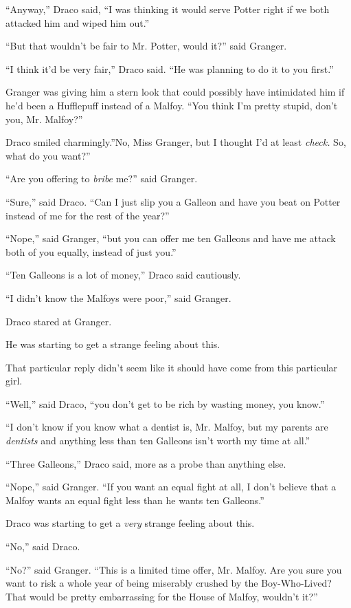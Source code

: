 ``Anyway,'' Draco said, ``I was thinking it would serve Potter right if
we both attacked him and wiped him out.''

``But that wouldn't be fair to Mr. Potter, would it?'' said Granger.

``I think it'd be very fair,'' Draco said. ``He was planning to do it to
you first.''

Granger was giving him a stern look that could possibly have intimidated
him if he'd been a Hufflepuff instead of a Malfoy. ``You think I'm
pretty stupid, don't you, Mr. Malfoy?''

Draco smiled charmingly.''No, Miss Granger, but I thought I'd at least
\emph{check.} So, what do you want?''

``Are you offering to \emph{bribe} me?'' said Granger.

``Sure,'' said Draco. ``Can I just slip you a Galleon and have you beat
on Potter instead of me for the rest of the year?''

``Nope,'' said Granger, ``but you can offer me ten Galleons and have me
attack both of you equally, instead of just you.''

``Ten Galleons is a lot of money,'' Draco said cautiously.

``I didn't know the Malfoys were poor,'' said Granger.

Draco stared at Granger.

He was starting to get a strange feeling about this.

That particular reply didn't seem like it should have come from this
particular girl.

``Well,'' said Draco, ``you don't get to be rich by wasting money, you
know.''

``I don't know if you know what a dentist is, Mr. Malfoy, but my parents
are \emph{dentists} and anything less than ten Galleons isn't worth my
time at all.''

``Three Galleons,'' Draco said, more as a probe than anything else.

``Nope,'' said Granger. ``If you want an equal fight at all, I don't
believe that a Malfoy wants an equal fight less than he wants ten
Galleons.''

Draco was starting to get a \emph{very} strange feeling about this.

``No,'' said Draco.

``No?'' said Granger. ``This is a limited time offer, Mr. Malfoy. Are
you sure you want to risk a whole year of being miserably crushed by the
Boy-Who-Lived? That would be pretty embarrassing for the House of
Malfoy, wouldn't it?''

